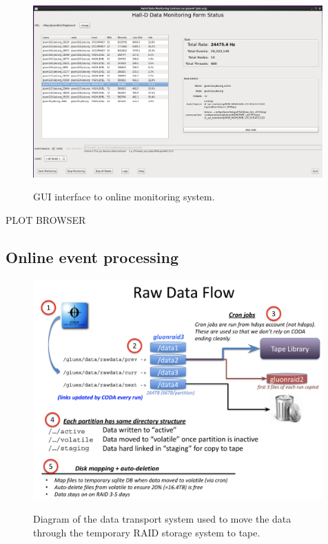 \begin{figure}[tbp]
\begin{center}
\includegraphics[width=0.99\textwidth]{figures/online_monitoring_hdmongui.png}
\label{fig:online_monitoring_hdmongui}
\caption{GUI interface to online monitoring system.}   
\end{center}  
\end{figure}

PLOT BROWSER


\subsection{Online event processing \label{sec:onlineprocessing}}

\begin{figure}[tbp]
\begin{center}
\includegraphics[width=0.99\textwidth]{figures/online_dataflow.png}
\label{fig:online_dataflow}
\caption{Diagram of the data transport system used to move the data through the temporary RAID storage system to tape.}   
\end{center}  
\end{figure}

